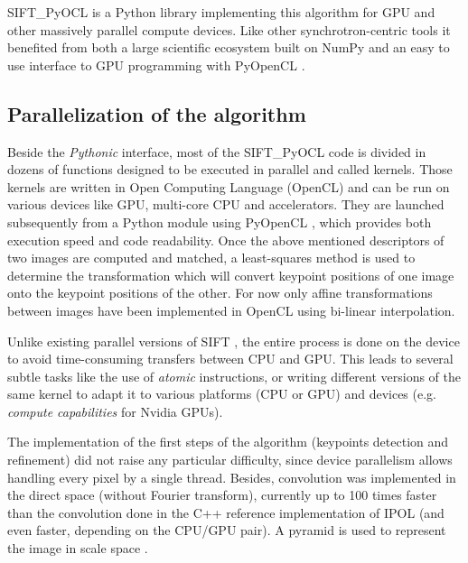 \documentclass[preprint]{iucr}
\begin{document}
SIFT\_PyOCL is a Python library implementing this algorithm for GPU
and other massively parallel compute devices.
Like other synchrotron-centric tools \cite{pyhst2,pynx,pyfai} it benefited
from both a large scientific ecosystem built on NumPy \cite{numpy} and an
easy to use interface to GPU programming with PyOpenCL \cite{pyopencl}.





\subsection{Parallelization of the algorithm}
Beside the \emph{Pythonic} interface, most of the
SIFT\_PyOCL code is divided in dozens of functions designed to be
executed in parallel and called kernels. Those kernels are written in Open
Computing Language (OpenCL) \cite{opencl} and  can be run on various
devices like GPU, multi-core CPU and accelerators.
They are launched subsequently from a Python module using PyOpenCL
\cite{pyopencl}, which provides both execution speed and code readability.
Once the above mentioned descriptors of two images are computed and matched, a
least-squares method is used to determine the transformation which will convert
keypoint positions of one image onto the keypoint positions of the other. For
now only affine transformations between images have been implemented in OpenCL
using bi-linear interpolation.

Unlike existing parallel versions of SIFT \cite{lu,rister,vasilyev}, the entire
process is done on the device to avoid time-consuming transfers between CPU and
GPU.
This leads to several subtle tasks like the use of \emph{atomic} instructions,
or writing different versions of the same kernel to adapt it to various
platforms (CPU or GPU) and devices (e.g. \emph{compute capabilities} for
Nvidia GPUs).

The implementation of the first steps of the algorithm (keypoints detection and
refinement) did not raise any particular difficulty, since device parallelism
allows handling every pixel by a single thread.
Besides, convolution was implemented in the direct space (without Fourier
transform), currently up to 100 times faster than the convolution done in
the C++ reference implementation of IPOL \cite{ASIFT}
(and even faster, depending on the CPU/GPU pair).
A pyramid is used to represent the image in scale space \cite{Lowe04}.
\end{document}
